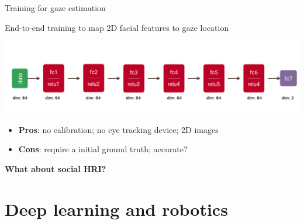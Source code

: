 \documentclass[compress]{beamer}
\begin{document}

\begin{frame}{Training for gaze estimation}

    \Large End-to-end training to map 2D facial features to gaze location

    \begin{center}
        \includegraphics[width=0.9\linewidth]{nn-gaze-estimation}
    \end{center}

    \begin{itemize}
        \item \textbf{Pros}: no calibration; no eye tracking device; 2D images
        \item \textbf{Cons}: require a initial ground truth; accurate?
    \end{itemize}
\end{frame}



\begin{frame}[plain]
    \begin{center}
    \Large\bf
        What about social HRI?
    \end{center}
\end{frame}
\section[DNNs]{Deep learning and robotics}
\end{document}
